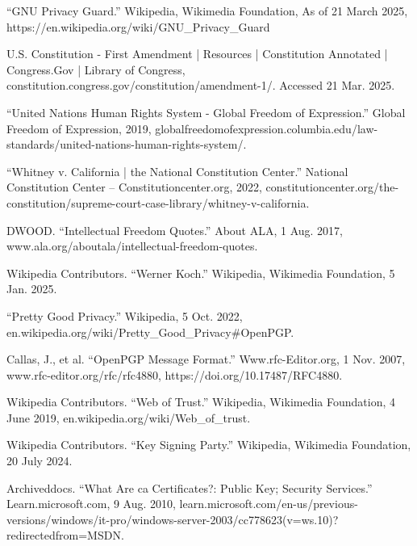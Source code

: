 \documentclass[twoside,twocolumn]{article}
\begin{document}
\begin{thebibliography}{99} %

  

  ``GNU Privacy Guard.'' Wikipedia, Wikimedia Foundation, As of 21 March 2025, https://en.wikipedia.org/wiki/GNU\_Privacy\_Guard

  U.S. Constitution - First Amendment | Resources | Constitution Annotated | Congress.Gov | Library of Congress, constitution.congress.gov/constitution/amendment-1/. Accessed 21 Mar. 2025. 

  “United Nations Human Rights System - Global Freedom of Expression.” Global Freedom of Expression, 2019, globalfreedomofexpression.columbia.edu/law-standards/united-nations-human-rights-system/.

  “Whitney v. California | the National Constitution Center.” National Constitution Center – Constitutioncenter.org, 2022, constitutioncenter.org/the-constitution/supreme-court-case-library/whitney-v-california.

  DWOOD. “Intellectual Freedom Quotes.” About ALA, 1 Aug. 2017, www.ala.org/aboutala/intellectual-freedom-quotes.

  Wikipedia Contributors. “Werner Koch.” Wikipedia, Wikimedia Foundation, 5 Jan. 2025.


  “Pretty Good Privacy.” Wikipedia, 5 Oct. 2022, en.wikipedia.org/wiki/Pretty\_Good\_Privacy\#OpenPGP.

  Callas, J., et al. “OpenPGP Message Format.” Www.rfc-Editor.org, 1 Nov. 2007, www.rfc-editor.org/rfc/rfc4880, https://doi.org/10.17487/RFC4880.


  Wikipedia Contributors. “Web of Trust.” Wikipedia, Wikimedia Foundation, 4 June 2019, en.wikipedia.org/wiki/Web\_of\_trust.

  Wikipedia Contributors. “Key Signing Party.” Wikipedia, Wikimedia Foundation, 20 July 2024.

  Archiveddocs. “What Are ca Certificates?: Public Key; Security Services.” Learn.microsoft.com, 9 Aug. 2010, learn.microsoft.com/en-us/previous-versions/windows/it-pro/windows-server-2003/cc778623(v=ws.10)?redirectedfrom=MSDN.


\end{thebibliography}
\end{document}
